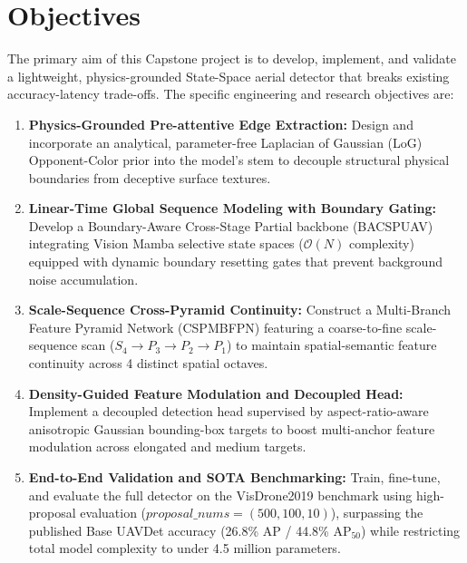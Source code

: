 \documentclass[12pt,a4paper]{report}
\begin{document}
\section{Objectives}
The primary aim of this Capstone project is to develop, implement, and validate a lightweight, physics-grounded State-Space aerial detector that breaks existing accuracy-latency trade-offs. The specific engineering and research objectives are:
\begin{enumerate}[leftmargin=2em]
    \item \textbf{Physics-Grounded Pre-attentive Edge Extraction:} Design and incorporate an analytical, parameter-free Laplacian of Gaussian (LoG) Opponent-Color prior into the model's stem to decouple structural physical boundaries from deceptive surface textures.
    \item \textbf{Linear-Time Global Sequence Modeling with Boundary Gating:} Develop a Boundary-Aware Cross-Stage Partial backbone (BACSPUAV) integrating Vision Mamba selective state spaces ($\mathcal{O}(N)$ complexity) equipped with dynamic boundary resetting gates that prevent background noise accumulation.
    \item \textbf{Scale-Sequence Cross-Pyramid Continuity:} Construct a Multi-Branch Feature Pyramid Network (CSPMBFPN) featuring a coarse-to-fine scale-sequence scan ($S_4 \to P_3 \to P_2 \to P_1$) to maintain spatial-semantic feature continuity across 4 distinct spatial octaves.
    \item \textbf{Density-Guided Feature Modulation and Decoupled Head:} Implement a decoupled detection head supervised by aspect-ratio-aware anisotropic Gaussian bounding-box targets to boost multi-anchor feature modulation across elongated and medium targets.
    \item \textbf{End-to-End Validation and SOTA Benchmarking:} Train, fine-tune, and evaluate the full detector on the VisDrone2019 benchmark using high-proposal evaluation ($ proposal\_nums=(500, 100, 10)$), surpassing the published Base UAVDet accuracy (26.8\% AP / 44.8\% $\text{AP}_{50}$) while restricting total model complexity to under 4.5 million parameters.
\end{enumerate}
\end{document}
